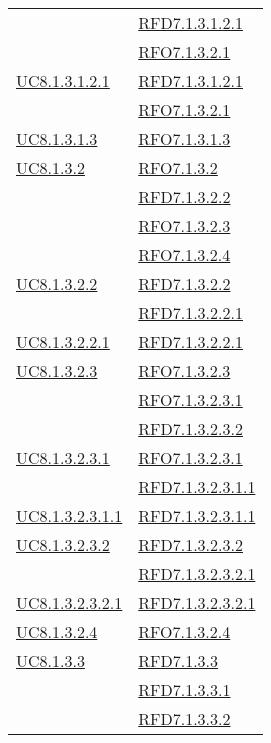 \begin{longtable}{|>{\centering}m{5cm}|m{5cm}<{\centering}|}
& \hyperlink{RFD7.1.3.1.2.1}{RFD7.1.3.1.2.1}\\
& \hyperlink{RFO7.1.3.2.1}{RFO7.1.3.2.1}\\ \hline
\hyperref[UC8.1.3.1.2.1]{UC8.1.3.1.2.1} & \hyperlink{RFD7.1.3.1.2.1}{RFD7.1.3.1.2.1}\\
& \hyperlink{RFO7.1.3.2.1}{RFO7.1.3.2.1}\\ \hline
\hyperref[UC8.1.3.1.3]{UC8.1.3.1.3} & \hyperlink{RFO7.1.3.1.3}{RFO7.1.3.1.3}\\ \hline
\hyperref[UC8.1.3.2]{UC8.1.3.2} & \hyperlink{RFO7.1.3.2}{RFO7.1.3.2}\\
& \hyperlink{RFD7.1.3.2.2}{RFD7.1.3.2.2}\\
& \hyperlink{RFO7.1.3.2.3}{RFO7.1.3.2.3}\\
& \hyperlink{RFO7.1.3.2.4}{RFO7.1.3.2.4}\\ \hline
\hyperref[UC8.1.3.2.2]{UC8.1.3.2.2} & \hyperlink{RFD7.1.3.2.2}{RFD7.1.3.2.2}\\
& \hyperlink{RFD7.1.3.2.2.1}{RFD7.1.3.2.2.1}\\ \hline
\hyperref[UC8.1.3.2.2.1]{UC8.1.3.2.2.1} & \hyperlink{RFD7.1.3.2.2.1}{RFD7.1.3.2.2.1}\\ \hline
\hyperref[UC8.1.3.2.3]{UC8.1.3.2.3} & \hyperlink{RFO7.1.3.2.3}{RFO7.1.3.2.3}\\
& \hyperlink{RFO7.1.3.2.3.1}{RFO7.1.3.2.3.1}\\
& \hyperlink{RFD7.1.3.2.3.2}{RFD7.1.3.2.3.2}\\ \hline
\hyperref[UC8.1.3.2.3.1]{UC8.1.3.2.3.1} & \hyperlink{RFO7.1.3.2.3.1}{RFO7.1.3.2.3.1}\\
& \hyperlink{RFD7.1.3.2.3.1.1}{RFD7.1.3.2.3.1.1}\\ \hline
\hyperref[UC8.1.3.2.3.1.1]{UC8.1.3.2.3.1.1} & \hyperlink{RFD7.1.3.2.3.1.1}{RFD7.1.3.2.3.1.1}\\ \hline
\hyperref[UC8.1.3.2.3.2]{UC8.1.3.2.3.2} & \hyperlink{RFD7.1.3.2.3.2}{RFD7.1.3.2.3.2}\\
& \hyperlink{RFD7.1.3.2.3.2.1}{RFD7.1.3.2.3.2.1}\\ \hline
\hyperref[UC8.1.3.2.3.2.1]{UC8.1.3.2.3.2.1} & \hyperlink{RFD7.1.3.2.3.2.1}{RFD7.1.3.2.3.2.1}\\ \hline
\hyperref[UC8.1.3.2.4]{UC8.1.3.2.4} & \hyperlink{RFO7.1.3.2.4}{RFO7.1.3.2.4}\\ \hline
\hyperref[UC8.1.3.3]{UC8.1.3.3} & \hyperlink{RFD7.1.3.3}{RFD7.1.3.3}\\
& \hyperlink{RFD7.1.3.3.1}{RFD7.1.3.3.1}\\
& \hyperlink{RFD7.1.3.3.2}{RFD7.1.3.3.2}\\ \hline

\end{longtable}

